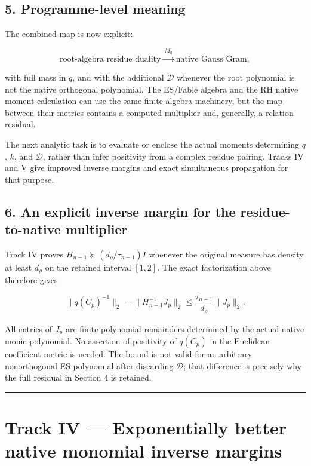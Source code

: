 \subsection{5. Programme-level meaning}\label{programme-level-meaning}

The combined map is now explicit:

\[
 \text{root-algebra residue duality}
 \xrightarrow{\ M_q\ }
 \text{native Gauss Gram},
\]

with full mass in \(q\), and with the additional \(\mathcal D\) whenever
the root polynomial is not the native orthogonal polynomial. The
ES/Fable algebra and the RH native moment calculation can use the same
finite algebra machinery, but the map between their metrics contains a
computed multiplier and, generally, a relation residual.

The next analytic task is to evaluate or enclose the actual moments
determining \(q\), \(k\), and \(\mathcal D\), rather than infer
positivity from a complex residue pairing. Tracks IV and V give improved
inverse margins and exact simultaneous propagation for that purpose.

\subsection{6. An explicit inverse margin for the residue-to-native
multiplier}\label{an-explicit-inverse-margin-for-the-residue-to-native-multiplier}

Track IV proves \(H_{n-1}\succeq(d_\rho/\tau_{n-1})I\) whenever the
original measure has density at least \(d_\rho\) on the retained
interval \([1,2]\). The exact factorization above therefore gives

\[
 \boxed{\|q(C_p)^{-1}\|_2
 =\|H_{n-1}^{-1}J_p\|_2
 \le\frac{\tau_{n-1}}{d_\rho}\|J_p\|_2.}
\]

All entries of \(J_p\) are finite polynomial remainders determined by
the actual native monic polynomial. No assertion of positivity of
\(q(C_p)\) in the Euclidean coefficient metric is needed. The bound is
not valid for an arbitrary nonorthogonal ES polynomial after discarding
\(\mathcal D\); that difference is precisely why the full residual in
Section 4 is retained.

\begin{center}\rule{0.5\linewidth}{0.5pt}\end{center}

\section{Track IV --- Exponentially better native monomial inverse
margins}\label{track-iv-exponentially-better-native-monomial-inverse-margins}

